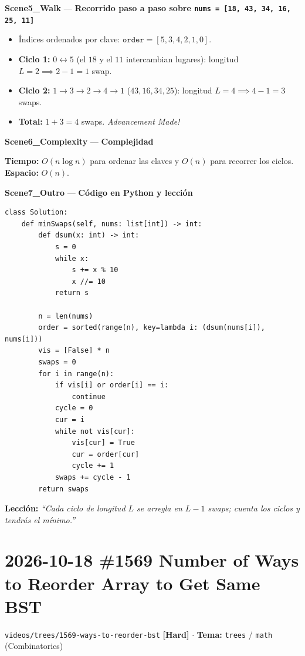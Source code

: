 \documentclass[letterpaper,10pt]{article}
\newcommand{\scene}[2]{\noindent\textbf{\textcolor{mcaqua}{#1}} --- \textbf{#2}\par\vspace{1pt}}
\newcommand{\folder}[1]{\texttt{\textcolor{mcgreen}{#1}}}
\newcommand{\badge}[2]{\textbf{\textcolor{#1}{[#2]}}}
\begin{document}
\begin{shaded}
\scene{Scene5\_Walk}{Recorrido paso a paso sobre \texttt{nums = [18, 43, 34, 16, 25, 11]}}
\begin{itemize}\setlength{\itemsep}{1pt}
  \item \'Indices ordenados por clave: $\texttt{order} = [5, 3, 4, 2, 1, 0]$.
  \item \textbf{Ciclo 1:} $0 \leftrightarrow 5$ (el $18$ y el $11$ intercambian lugares): longitud $L = 2 \implies 2 - 1 = 1$ swap.
  \item \textbf{Ciclo 2:} $1 \to 3 \to 2 \to 4 \to 1$ ($43, 16, 34, 25$): longitud $L = 4 \implies 4 - 1 = 3$ swaps.
  \item \textbf{Total:} $1 + 3 = 4$ swaps. \textit{Advancement Made!}
\end{itemize}

\scene{Scene6\_Complexity}{Complejidad}
\textbf{Tiempo:} $O(n \log n)$ para ordenar las claves y $O(n)$ para recorrer los ciclos. \quad \textbf{Espacio:} $O(n)$.
\end{shaded}

\scene{Scene7\_Outro}{C\'odigo en Python y lecci\'on}
\begin{Verbatim}[frame=single,fontsize=\small]
class Solution:
    def minSwaps(self, nums: list[int]) -> int:
        def dsum(x: int) -> int:
            s = 0
            while x:
                s += x % 10
                x //= 10
            return s

        n = len(nums)
        order = sorted(range(n), key=lambda i: (dsum(nums[i]), nums[i]))
        vis = [False] * n
        swaps = 0
        for i in range(n):
            if vis[i] or order[i] == i:
                continue
            cycle = 0
            cur = i
            while not vis[cur]:
                vis[cur] = True
                cur = order[cur]
                cycle += 1
            swaps += cycle - 1
        return swaps
\end{Verbatim}
\textbf{Lecci\'on:} \textit{``Cada ciclo de longitud $L$ se arregla en $L-1$ swaps; cuenta los ciclos y tendr\'as el m\'inimo.''}

\newpage

\section{2026-10-18 \textbar{} \#1569 Number of Ways to Reorder Array to Get Same BST}
\folder{videos/trees/1569-ways-to-reorder-bst} \hfill \badge{mcred}{Hard} $\cdot$ \textbf{Tema:} \texttt{trees} / \texttt{math} (Combinatorics)
\end{document}
